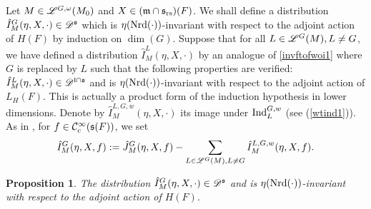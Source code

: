 \documentclass[a4paper]{amsart}
\newcommand{\fm}{{\mathfrak{m}}} \newcommand{\fn}{{\mathfrak{n}}}\newcommand{\fo}{{\mathfrak{o}}} \newcommand{\fp}{{\mathfrak{p}}}
\newtheorem{prop}[thm]{Proposition}
\theoremstyle{definition}
\theoremstyle{remark}
\numberwithin{equation}{subsection}
\begin{document}
Let $M\in\mathscr{L}^{G,\omega}(M_0)$ and $X\in(\fm\cap\fs_\rs)(F)$. We shall define a distribution $\hat{I}_M^G(\eta, X, \cdot)\in\mathscr{D}^{\mathfrak{s}}$ which is $\eta({\mathrm{Nrd}}(\cdot))$-invariant with respect to the adjoint action of $H(F)$ by induction on $\dim(G)$. Suppose that for all $L\in\mathscr{L}^G(M), L\neq G$, we have defined a distribution $\hat{I}_M^L(\eta, X, \cdot)$ by an analogue of \eqref{invftofwoi1} where $G$ is replaced by $L$ such that the following properties are verified: $\hat{I}_M^L(\eta, X, \cdot)\in\mathscr{D}^{{\mathfrak{l}}\cap{\mathfrak{s}}}$ and is $\eta({\mathrm{Nrd}}(\cdot))$-invariant with respect to the adjoint action of $L_H(F)$. This is actually a product form of the induction hypothesis in lower dimensions. Denote by $\hat{I}_M^{L,G,w}(\eta, X, \cdot)$ its image under ${\mathrm{Ind}}_L^{G, w}$ (see (\ref{wtind1})). As in \cite[(1) in \S VI.1]{MR1344131}, for $f\in{\mathcal {C}}_c^\infty({\mathfrak{s}}(F))$, we set
\begin{equation}\label{invftofwoi1}
 \hat{I}_M^G(\eta, X, f):=\hat{J}_M^G(\eta, X, f)-\sum_{L\in\mathscr{L}^G(M), L\neq G} \hat{I}_M^{L,G,w}(\eta, X, f). 
\end{equation}

\begin{prop}\label{propVI.1.1}
The distribution $\hat{I}_M^G(\eta, X, \cdot)\in\mathscr{D}^{\mathfrak{s}}$ and is $\eta({\mathrm{Nrd}}(\cdot))$-invariant with respect to the adjoint action of $H(F)$. 
\end{prop}
\end{document}
